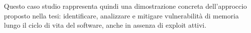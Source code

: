 Questo caso studio rappresenta quindi una dimostrazione concreta dell'approccio proposto
nella tesi: identificare, analizzare e mitigare vulnerabilità di memoria lungo il
ciclo di vita del software, anche in assenza di exploit attivi.



